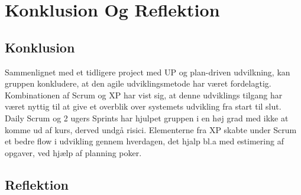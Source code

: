 \chapter{Konklusion Og Reflektion}\label{ch:KonklusionReflektion}

\section{Konklusion}


Sammenlignet med et tidligere project med UP og plan-driven udvilkning, kan gruppen konkludere, at den agile udviklingsmetode har været fordelagtig. Kombinationen af Scrum og XP har vist sig, at denne udviklings tilgang har været nyttig til at give et overblik over systemets udvikling fra start til slut. Daily Scrum og 2 ugers Sprints har hjulpet gruppen i en høj grad med ikke at komme ud af kurs, derved undgå risici. Elementerne fra XP skabte under Scrum et bedre flow i udvikling gennem hverdagen, det hjalp bl.a med estimering af opgaver, ved hjælp af planning poker. 
\section{Reflektion}